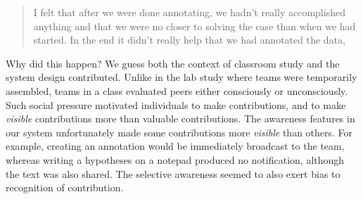 \begin{quote}
I felt that after we were done annotating, we hadn't really accomplished
anything and that we were no closer to solving the case than when we had
started. In the end it didn't really help that we had annotated the
data,
\end{quote}

Why did this happen? We guess both the context of classroom study and
the system design contributed. Unlike in the lab study where teams were
temporarily assembled, teams in a class evaluated peers either
consciously or unconsciously. Such social pressure motivated individuals
to make contributions, and to make \emph{visible} contributions more
than valuable contributions. The awareness features in our system
unfortunately made some contributions more \emph{visible} than others.
For example, creating an annotation would be immediately broadcast to
the team, whereas writing a hypotheses on a notepad produced no
notification, although the text was also shared. The selective awareness
seemed to also exert bias to recognition of contribution.
